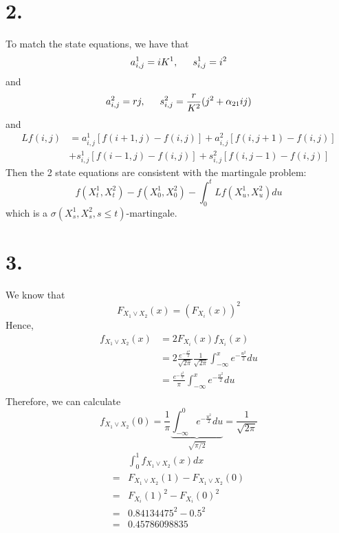 \documentclass[11pt]{article}
\begin{document}
\section*{2.}
To match the state equations, we have that 
\[
    a_{i,j}^1 =  iK^1, \indent s_{i,j}^1 = i^2
\]
and 
\[
    a_{i,j}^2 = rj , \indent s_{i,j}^2 = \frac{r}{K^2}(j^2 + \alpha_{21}ij)
\]
and 
\begin{equation*}
    \begin{aligned}
        Lf(i,j) &= a_{i, j}^1 [f(i+1,j) - f(i,j)] + a_{i, j}^2 [f(i,j+1) - f(i,j)] \\
        &+ s_{i, j}^1 [f(i-1,j) - f(i,j)] + s_{i, j}^2 [f(i,j-1) - f(i,j)] 
    \end{aligned}
\end{equation*}
Then the 2 state equations are consistent with the martingale problem:
\[
    f(X_t^1, X_t^2) - f(X_0^1, X_0^2) - \int_0^t Lf(X_u^1, X_u^2) du    
\]
which is a $\sigma(X^1_s, X^2_s, s \le t)$-martingale.
\newpage
\section*{3.}
We know that 
\[
    F_{X_1 \vee X_2}(x) = \left(F_{X_i}(x) \right)^2     
\]
Hence, 
\begin{equation*}
    \begin{aligned}
        f_{X_1 \vee X_2}(x) &= 2 F_{X_i}(x) f_{X_i}(x) \\
        &= 2 \frac{e^{- \frac{x^2}{2}}}{\sqrt{2\pi}} \frac{1}{\sqrt{2\pi}} \int_{-\infty}^x e^{-\frac{u^2}{2}}du  \\
        &= \frac{e^{- \frac{x^2}{2}}}{\pi}  \int_{-\infty}^x e^{-\frac{u^2}{2}}du  \\
    \end{aligned}
\end{equation*}
Therefore, we can calculate 
\[
    f_{X_1 \vee X_2}(0) = \frac{1}{\pi} \underbrace{\int_{-\infty}^0 e^{-\frac{u^2}{2}}du}_{\sqrt{\pi/2}} = \frac{1}{\sqrt{2\pi}}
\]
\begin{equation*}
    \begin{aligned}
        &\int_0^1 f_{X_1 \vee X_2}(x) dx\\
        =& F_{X_1 \vee X_2}(1) - F_{X_1 \vee X_2}(0) \\
        =& F_{X_i}(1)^2 - F_{X_i}(0)^2 \\
        =& 0.84134475^2 - 0.5^2 \\
        =& 0.45786098835\\ 
    \end{aligned}
\end{equation*}
\newpage
\end{document}
